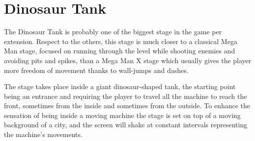 \section{Dinosaur Tank}
The Dinosaur Tank is probably one of the biggest stage in the game per extension. Respect to the others, this stage is much closer to a classical Mega Man stage, focused on running through the level while shooting enemies and avoiding pits and spikes, than a  Mega Man X stage which usually gives the player more freedom of movement thanks to wall-jumps and dashes.

The stage takes place inside a giant dinosaur-shaped tank, the starting point being an entrance and requiring the player to travel all the machine to reach the front, sometimes from the inside and sometimes from the outside. To enhance the sensation of being inside a moving machine the stage is set on top of a moving background of a city, and the screen will shake at constant intervals representing the machine's movements.

